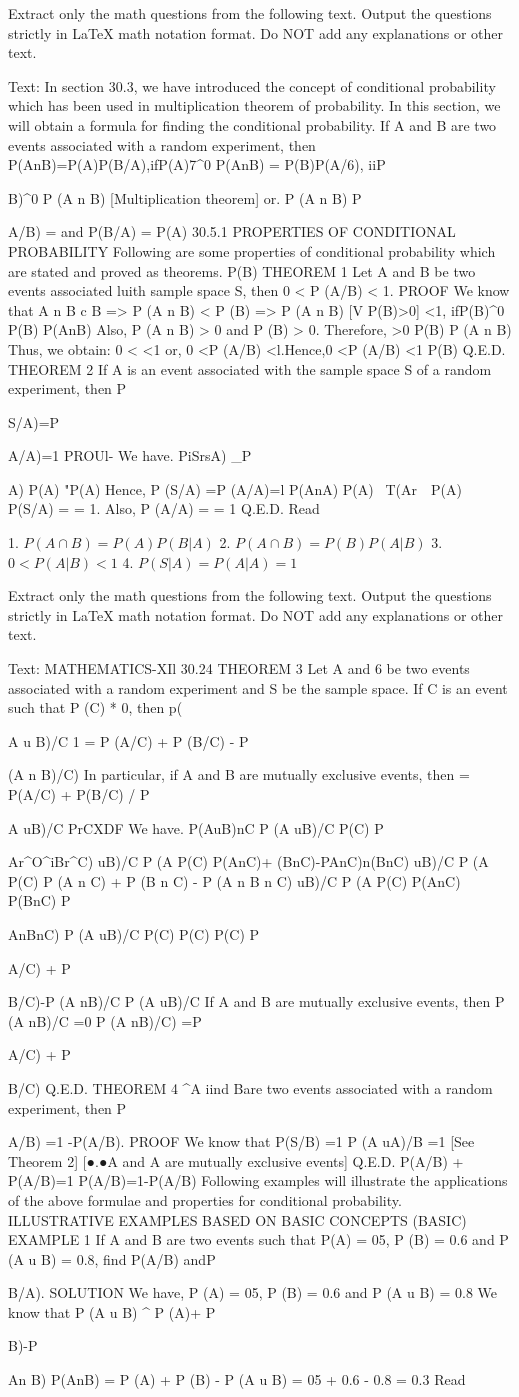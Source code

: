 Extract only the math questions from the following text.
Output the questions strictly in LaTeX math notation format.
Do NOT add any explanations or other text.

Text:
In section 30.3, we have introduced the concept of conditional probability which has been used
in multiplication theorem of probability. In this section, we will obtain a formula for finding the
conditional probability.
If A and B are two events associated with a random experiment, then
P(AnB)=P(A)P(B/A),ifP(A)7^0
P(AnB) = P(B)P(A/6), iiP{B)^0
P (A n B)
[Multiplication theorem]
or.
P (A n B)
P{A/B) =
and P(B/A) =
P(A)
30.5.1
PROPERTIES OF CONDITIONAL PROBABILITY
Following are some properties of conditional probability which are stated and proved as
theorems.
P(B)
THEOREM 1
Let A and B be two events associated luith sample space S, then 0 < P (A/B) < 1.
PROOF
We know that
A n B c B => P (A n B) < P (B) => P (A n B)
[V P(B)>0]
<1, ifP(B)^0
P(B)
P(AnB)
Also,
P (A n B) > 0 and P (B) > 0. Therefore,
>0
P(B)
P (A n B)
Thus, we obtain:
0
<
<1
or, 0 <P (A/B) <l.Hence,0 <P (A/B) <1
P(B)
Q.E.D.
THEOREM 2
If A is an event associated with the sample space S of a random experiment, then
P{S/A)=P{A/A)=1
PROUl-
We have.
PiSrsA) _P{A)
P(A)
"P(A)
Hence,
P (S/A) =P (A/A)=l
P(AnA)
P(A)
~T(Ar~~P(A)
P(S/A) =
= 1. Also, P (A/A) =
= 1
Q.E.D.
Read

1. $P(A \cap B) = P(A)P(B|A)$
2. $P(A \cap B) = P(B)P(A|B)$
3. $0 < P(A|B) < 1$
4. $P(S|A) = P(A|A) = 1$

Extract only the math questions from the following text.
Output the questions strictly in LaTeX math notation format.
Do NOT add any explanations or other text.

Text:
MATHEMATICS-XIl
30.24
THEOREM 3
Let A and 6 be two events associated with a random experiment and S be the sample space.
If C is an event such that P (C) * 0, then
p({A u B)/C 1 = P (A/C) + P (B/C) - P {(A n B)/C)
In particular, if A and B are mutually exclusive events, then
= P(A/C) + P(B/C)
/
P
{A uB)/C
PrCXDF
We have.
P{(AuB)nC}
P
(A uB)/C
P(C)
P {{Ar^O^iBr^C)}
uB)/C
P
(A
P(C)
P(AnC)+ (BnC)-P{AnC)n(BnC)}
uB)/C
P
(A
P(C)
P (A n C) + P (B n C) - P (A n B n C)
uB)/C
P
(A
P(C)
P(AnC)
P(BnC)
P{AnBnC)
P
(A uB)/C
P(C)
P(C)
P(C)
P{A/C) + P{B/C)-P
(A nB)/C
P
(A uB)/C
If A and B are mutually exclusive events, then P
(A nB)/C
=0
P
(A nB)/C)
=P{A/C) + P{B/C)
Q.E.D.
THEOREM 4 ^A iind Bare two events associated with a random experiment, then P{A/B) =1 -P(A/B).
PROOF
We know that
P(S/B) =1
P
(A uA)/B
=1
[See Theorem 2]
[●.●A and A are mutually exclusive events]
Q.E.D.
P(A/B) + P(A/B)=1
P(A/B)=1-P(A/B)
Following examples will illustrate the applications of the above formulae and properties for
conditional probability.
ILLUSTRATIVE EXAMPLES
BASED ON BASIC CONCEPTS (BASIC)
EXAMPLE 1
If A and B are two events such that P(A) = 05, P (B) = 0.6 and P (A u B) = 0.8, find
P(A/B) andP{B/A).
SOLUTION
We have, P (A) = 05, P (B) = 0.6 and P (A u B) = 0.8
We know that
P (A u B) ^ P (A)+ P{B)-P {An B)
P(AnB) = P (A) + P (B) - P (A u B) = 05 + 0.6 - 0.8 = 0.3
Read

}}}}}}}}}}}}}}}}}}
